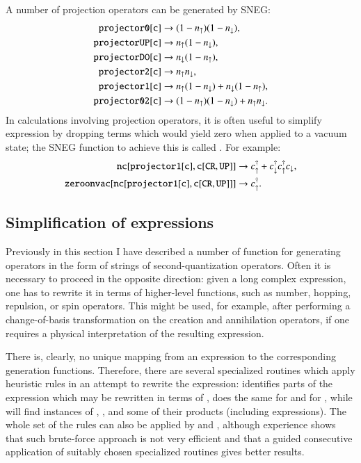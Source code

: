 \documentclass[3p,number,preprint]{elsarticle}
\begin{document}
A number of projection operators can be generated by SNEG:
%
\begin{equation}
\begin{split}
{\tt projector0[c]} &\to (1-n_\uparrow)(1-n_\downarrow), \\
{\tt projectorUP[c]} &\to n_\uparrow(1-n_\downarrow), \\
{\tt projectorDO[c]} &\to n_\downarrow(1-n_\uparrow), \\
{\tt projector2[c]} &\to n_\uparrow n_\downarrow, \\
{\tt projector1[c]} &\to n_\uparrow(1-n_\downarrow) +
n_\downarrow(1-n_\uparrow), \\
{\tt projector02[c]} &\to (1-n_\uparrow)(1-n_\downarrow) + n_\uparrow
n_\downarrow.
\end{split}
\end{equation}
%
In calculations involving projection operators, it is often useful to 
simplify expression by dropping terms which would yield zero when
applied to a vacuum state; the SNEG function to achieve this is called
. For example:
%
\begin{equation}
\begin{split}
{\tt nc[projector1[c],c[CR,UP]]} &\to c^\dag_\uparrow +
c^\dag_\downarrow
c^\dag_\uparrow c_\downarrow, \\
{\tt zeroonvac[nc[projector1[c],c[CR,UP]]]} &\to c^\dag_\uparrow.
\end{split}
\end{equation}


\subsection{Simplification of expressions}

Previously in this section I have described a number of function for
generating operators in the form of strings of second-quantization
operators. Often it is necessary to proceed in the opposite direction:
given a long complex expression, one has to rewrite it in terms of
higher-level functions, such as number, hopping, repulsion, or spin
operators. This might be used, for example, after performing a
change-of-basis transformation on the creation and annihilation
operators, if one requires a physical interpretation of the resulting
expression.

There is, clearly, no unique mapping from an expression to the 
corresponding generation functions. Therefore, there are several
specialized routines which apply heuristic rules in an attempt to
rewrite the expression:  identifies parts of
the expression which may be rewritten in terms of ,
 does the same for  and
 for , while 
will find instances of , ,  and some
of their products (including  expressions). The whole
set of the rules can also be applied by  and
, although experience shows that such
brute-force approach is not very efficient and that a guided
consecutive application of suitably chosen specialized routines gives
better results.
\end{document}
